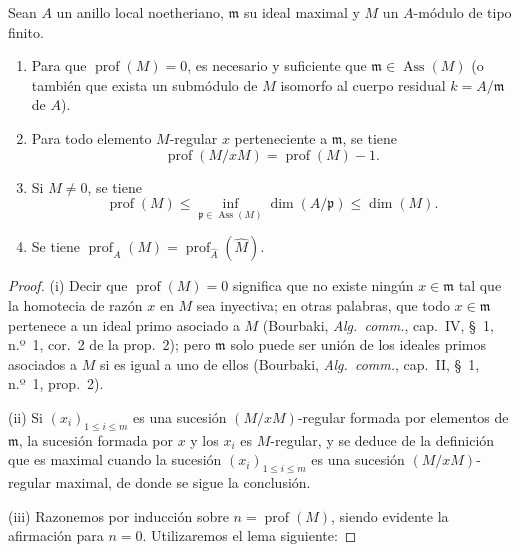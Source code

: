 \begin{proposition}[16.4.6]
Sean $A$ un anillo local noetheriano, $\mathfrak{m}$ su ideal maximal y $M$ un
$A$-módulo de tipo finito.
\begin{enumerate}
  \item[\rm{(i)}] Para que $\operatorname{prof}(M)=0$, es necesario y
  suficiente que $\mathfrak{m}\in\operatorname{Ass}(M)$ \textup{(o también que exista
  un submódulo de $M$ isomorfo al cuerpo residual $k=A/\mathfrak{m}$ de $A$)}.
  \item[\rm{(ii)}] Para todo elemento $M$-regular $x$ perteneciente a
  $\mathfrak{m}$, se tiene
  \begin{equation}
  \label{0.16.4.6.1-fr}
  \tag{16.4.6.1}
    \operatorname{prof}(M/xM)=\operatorname{prof}(M)-1.
  \end{equation}
  \item[\rm{(iii)}] Si $M\neq0$, se tiene
  \begin{equation}
  \label{0.16.4.6.2-fr}
  \tag{16.4.6.2}
    \operatorname{prof}(M)
    \leq\inf_{\mathfrak{p}\in\operatorname{Ass}(M)}\dim(A/\mathfrak{p})
    \leq\dim(M).
  \end{equation}
  \item[\rm{(iv)}] Se tiene
  $\operatorname{prof}_A(M)=
  \operatorname{prof}_{\widehat{A}}(\widehat{M})$.
\end{enumerate}
\end{proposition}

\begin{proof}
(i) Decir que $\operatorname{prof}(M)=0$ significa que no existe ningún
$x\in\mathfrak{m}$ tal que la homotecia de razón $x$ en $M$ sea inyectiva; en
otras palabras, que todo $x\in\mathfrak{m}$ pertenece a un ideal primo
asociado a $M$ (Bourbaki, \emph{Alg.~comm.}, cap.~IV, \S~1, n.º~1, cor.~2 de
la prop.~2); pero $\mathfrak{m}$ solo puede ser unión de los ideales primos
asociados a $M$ si es igual a uno de ellos (Bourbaki,
\emph{Alg.~comm.}, cap.~II, \S~1, n.º~1, prop.~2).

(ii) Si $(x_i)_{1\leq i\leq m}$ es una sucesión $(M/xM)$-regular formada por
elementos de $\mathfrak{m}$, la sucesión formada por $x$ y los $x_i$ es
$M$-regular, y se deduce de la definición que es maximal cuando la sucesión
$(x_i)_{1\leq i\leq m}$ es una sucesión $(M/xM)$-regular maximal, de donde se
sigue la conclusión.

(iii) Razonemos por inducción sobre $n=\operatorname{prof}(M)$, siendo evidente
la afirmación para $n=0$. Utilizaremos el lema siguiente:
\end{proof}

